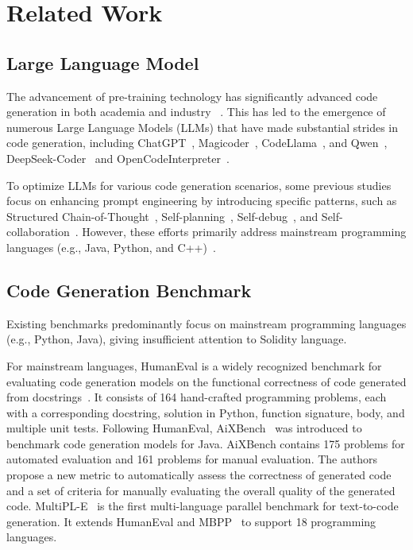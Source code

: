 \section{Related Work}


\subsection{Large Language Model}

The advancement of pre-training technology has significantly advanced code generation in both academia and industry ~\cite{li2022competition,shen2022incorporating,nijkamp2022codegen,fried2023incoder}. 
This has led to the emergence of numerous Large Language Models (LLMs) that have made substantial strides in code generation, including ChatGPT~\cite{openai2022chatgpt}, Magicoder~\cite{wei2023magicoder}, CodeLlama~\cite{roziere2023code}, and Qwen~\cite{bai2023qwen}, DeepSeek-Coder~\cite{deepseekcoder} and OpenCodeInterpreter~\cite{zheng2024opencodeinterpreter}.

To optimize LLMs for various code generation scenarios, some previous studies focus on enhancing prompt engineering by introducing specific patterns, such as Structured Chain-of-Thought~\cite{yin2024thinkrepair,li2025structured}, Self-planning~\cite{jiang2024self}, Self-debug~\cite{chen2023teaching,xia2023keep}, and Self-collaboration~\cite{dong2024self,yin2024rectifier}. 
However, these efforts primarily address mainstream programming languages (e.g., Java, Python, and C++)~\cite{yin2024rectifier,yin2024you,xia2023keep}.


\subsection{Code Generation Benchmark}
Existing benchmarks predominantly focus on mainstream programming languages (e.g., Python, Java), giving insufficient attention to Solidity language.


For mainstream languages, HumanEval is a widely recognized benchmark for evaluating code generation models on the functional correctness of code generated from docstrings~\cite{chen2021evaluating}. 
It consists of 164 hand-crafted programming problems, each with a corresponding docstring, solution in Python, function signature, body, and multiple unit tests. 
Following HumanEval, AiXBench~\cite{hao2022aixbench} was introduced to benchmark code generation models for Java. 
AiXBench contains 175 problems for automated evaluation and 161 problems for manual evaluation.
The authors propose a new metric to automatically assess the correctness of generated code and a set of criteria for manually evaluating the overall quality of the generated code. 
MultiPL-E~\cite{cassano2023multipl} is the first multi-language parallel benchmark for text-to-code generation. It extends HumanEval and MBPP~\cite{austin2021program} to support 18 programming languages. 


